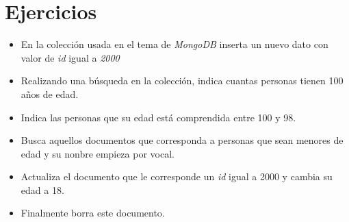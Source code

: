 \documentclass[4paper]{article}
\begin{document}
\section{Ejercicios}
\begin{itemize}
\item En la colección usada en el tema de \emph{MongoDB} inserta un nuevo dato con valor de \emph{id} igual a \emph{2000}
\item Realizando una búsqueda en la colección, indica cuantas personas tienen 100 años de edad.
\item Indica las personas que su edad está comprendida entre 100 y 98.
\item Busca aquellos documentos que corresponda a personas que sean menores de edad y su nonbre empieza por vocal.
\item Actualiza el documento que le corresponde un \emph{id} igual a 2000 y cambia su edad a 18.
\item Finalmente borra este documento.
\end{itemize}
\end{document}
